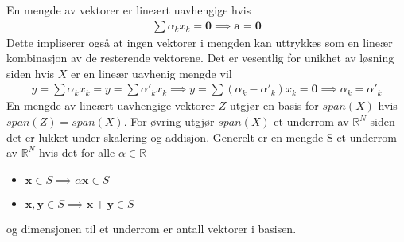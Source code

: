 En mengde av vektorer er lineært uavhengige hvis
\begin{align}
\sum \alpha_k x_k =\mathbf{0} \implies \mathbf{a} = \mathbf{0}
\end{align}
Dette impliserer også at ingen vektorer i mengden kan uttrykkes som en lineær kombinasjon av de resterende vektorene. Det er vesentlig for unikhet av løsning siden hvis $X$ er en lineær uavhenig mengde vil
\begin{align}
y = \sum \alpha_k x_k = y = \sum \alpha'_k x_k \implies y = \sum (\alpha_k-\alpha'_k) x_k = \mathbf{0} \implies \alpha_k=\alpha'_k  
\end{align}
En mengde av lineært uavhengige vektorer $Z$ utgjør en basis for $span(X)$ hvis $span(Z) = span(X)$. For øvring utgjør $span(X)$ et underrom av $\mathbb{R}^N$ siden det er lukket under skalering og addisjon. Generelt er en mengde S et underrom av $\mathbb{R}^N$ hvis det for alle $\alpha \in \mathbb{R}$
\begin{itemize}
\item $\mathbf{x} \in S \implies \alpha \mathbf{x} \in S$
\item $\mathbf{x},\mathbf{y} \in S \implies \mathbf{x} +\mathbf{y} \in S$
\end{itemize}
og dimensjonen til et underrom er antall vektorer i basisen.
